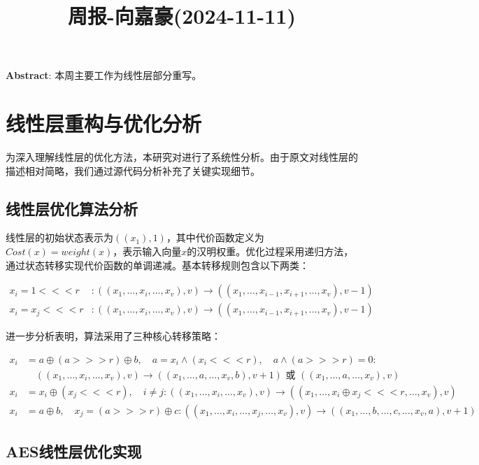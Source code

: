 \documentclass[11pt,a4paper]{article}
\title{周报-向嘉豪(2024-11-11)}
\newcommand{\lll}{\mathrel{<\!\!<\!\!<}}
\newcommand{\ggg}{\mathrel{>\!\!>\!\!>}}
\renewcommand{\maketitle}{
  \begin{center}
    \LARGE\bfseries\thetitle
  \end{center}
}
\begin{document}
\maketitle


\noindent \textbf{Abstract}: 本周主要工作为线性层部分重写。


\section{线性层重构与优化分析}

为深入理解线性层的优化方法，本研究对\cite{Leurent2024}进行了系统性分析。由于原文对线性层的描述相对简略，我们通过源代码分析补充了关键实现细节。

\subsection{线性层优化算法分析}

线性层的初始状态表示为$((x_1), 1)$，其中代价函数定义为$Cost(x) = weight(x)$，表示输入向量$x$的汉明权重。优化过程采用递归方法，通过状态转移实现代价函数的单调递减。基本转移规则包含以下两类：

\begin{align}
x_{i} = 1 \lll r & : ((x_1, \dots, x_{i}, \dots, x_v), v) \rightarrow ((x_1, \dots, x_{i-1}, x_{i+1}, \dots, x_v), v-1) \\
x_{i} = x_{j} \lll r & : ((x_1, \dots, x_{i}, \dots, x_v), v) \rightarrow ((x_1, \dots, x_{i-1}, x_{i+1}, \dots, x_v), v-1)
\end{align}

进一步分析表明，算法采用了三种核心转移策略：

\begin{align}
x_i &= a \oplus (a \ggg r) \oplus b, \quad a = x_i \land (x_i \lll r), \quad a \land (a \ggg r) = 0 : \nonumber \\
&\quad ((x_1, \dots, x_{i}, \dots, x_v), v) \rightarrow ((x_1, \dots, a, \dots, x_v, b), v+1) \text{ 或 } ((x_1, \dots, a, \dots, x_v), v) \\
x_{i} &= x_{i} \oplus (x_{j} \lll r), \quad i \neq j : ((x_1, \dots, x_{i}, \dots, x_v), v) \rightarrow ((x_1, \dots, x_{i} \oplus x_{j} \lll r, \dots, x_v), v) \\
x_i &= a \oplus b, \quad x_j = (a \ggg r) \oplus c : ((x_1, \dots, x_{i}, \dots, x_{j}, \dots, x_v), v) \rightarrow ((x_1, \dots, b, \dots, c, \dots, x_v, a), v+1)
\end{align}

\subsection{AES线性层优化实现}
\end{document}
